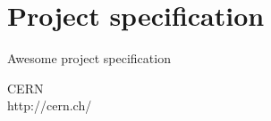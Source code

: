 \documentclass[oneside,11pt]{extarticle}
\begin{document}


\setcounter{page}{2}

\tableofcontents
\clearpage

\section{Project specification}
Awesome project specification

\begin{thebibliography}{99}
 CERN\\ http://cern.ch/
\end{thebibliography}
\end{document}
